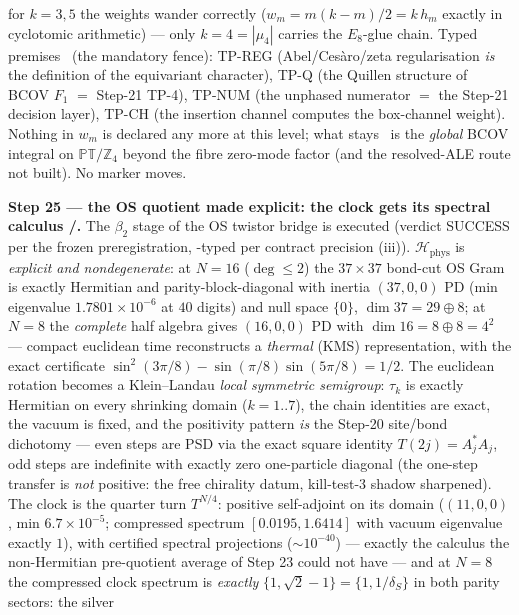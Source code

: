\documentclass[11pt,a4paper]{article}
\newcommand{\Z}{\mathbb{Z}}
\theoremstyle{definition}
\begin{document}
for $k = 3, 5$ the weights wander correctly ($w_m = m(k-m)/2 = k\,h_m$ exactly in cyclotomic
arithmetic) --- only $k = 4 = |\mu_4|$ carries the $E_8$-glue chain. Typed premises \mC\ (the
mandatory fence): TP-REG (Abel/Ces\`aro/zeta regularisation \emph{is} the definition of the
equivariant character), TP-Q (the Quillen structure of BCOV $F_1$ $=$ Step-21 TP-4), TP-NUM
(the unphased numerator $=$ the Step-21 decision layer), TP-CH (the insertion channel computes
the box-channel weight). Nothing in $w_m$ is declared any more at this level; what stays \mO\
is the \emph{global} BCOV integral on $\mathbb{PT}/\Z_4$ beyond the fibre zero-mode factor
(and the resolved-ALE route not built). No marker moves.

\par\smallskip\noindent\textbf{Step 25 --- the OS quotient made explicit: the clock gets its
spectral calculus \mE/\mC.} The $\beta_2$ stage of the OS twistor bridge is executed (verdict
SUCCESS per the frozen preregistration, \mC-typed per contract precision (iii)).
$\mathcal H_{\mathrm{phys}}$ is \emph{explicit and nondegenerate}: at $N = 16$ ($\deg\le2$)
the $37{\times}37$ bond-cut OS Gram is exactly Hermitian and parity-block-diagonal with
inertia $(37,0,0)$ PD (min eigenvalue $1.7801\times10^{-6}$ at $40$ digits) and null space
$\{0\}$, $\dim 37 = 29 \oplus 8$; at $N = 8$ the \emph{complete} half algebra gives $(16,0,0)$
PD with $\dim 16 = 8 \oplus 8 = 4^2$ --- compact euclidean time reconstructs a \emph{thermal}
(KMS) representation, with the exact certificate $\sin^2(3\pi/8) - \sin(\pi/8)\sin(5\pi/8) =
1/2$. The euclidean rotation becomes a Klein--Landau \emph{local symmetric semigroup}:
$\tau_k$ is exactly Hermitian on every shrinking domain ($k = 1..7$), the chain identities are
exact, the vacuum is fixed, and the positivity pattern \emph{is} the Step-20 site/bond
dichotomy --- even steps are PSD via the exact square identity $T(2j) = A_j^*A_j$, odd steps
are indefinite with exactly zero one-particle diagonal (the one-step transfer is \emph{not}
positive: the free chirality datum, kill-test-3 shadow sharpened). The clock is the quarter
turn $T^{N/4}$: positive self-adjoint on its domain ($(11,0,0)$, min $6.7\times10^{-5}$;
compressed spectrum $[0.0195, 1.6414]$ with vacuum eigenvalue exactly $1$), with certified
spectral projections ($\sim10^{-40}$) --- exactly the calculus the non-Hermitian pre-quotient
average of Step 23 could not have --- and at $N = 8$ the compressed clock spectrum is
\emph{exactly} $\{1, \sqrt2 - 1\} = \{1, 1/\delta_S\}$ in both parity sectors: the silver
\end{document}
